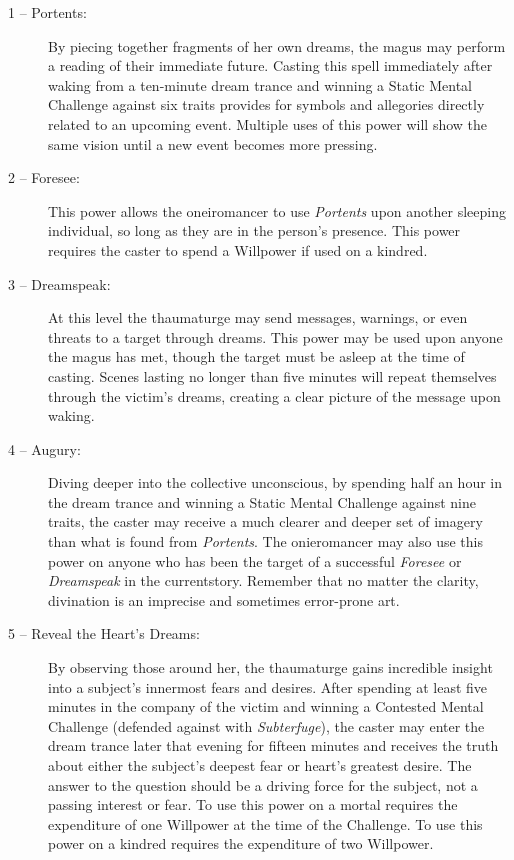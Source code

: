 \begin{description}
	\item[1 -- Portents:]  By piecing together fragments of her own dreams, the magus may perform a reading of their 
	immediate future.  Casting this spell immediately after waking from a ten-minute dream trance and winning a 
	Static Mental Challenge against six traits provides for symbols and allegories directly related to an upcoming 
	event.  Multiple uses of this power will show the same vision until a new event becomes more pressing.
	\item[2 -- Foresee:]  This power allows the oneiromancer to use \emph{Portents} upon another sleeping individual, 
	so long as they are in the person's presence.  This power requires the caster to spend a Willpower if used on 
	a kindred.
	\item[3 -- Dreamspeak:]  At this level the thaumaturge may send messages, warnings, or even threats to a target 
	through dreams.  This power may be used upon anyone the magus has met, though the target must be asleep at the time 
	of casting.  Scenes lasting no longer than five minutes will repeat themselves through the victim's dreams, creating 
	a clear picture of the message upon waking.
	\item[4 -- Augury:]  Diving deeper into the collective unconscious, by spending half an hour in the dream trance and 
	winning a Static Mental Challenge against nine traits, the caster may receive a much clearer and deeper set of imagery 
	than what is found from \emph{Portents}.  The onieromancer may also use this power on anyone who has been the target 
	of a successful \emph{Foresee} or \emph{Dreamspeak} in the currentstory.  Remember that no matter the clarity, divination 
	is an imprecise and sometimes error-prone art.
	\item[5 -- Reveal the Heart's Dreams:]  By observing those around her, the thaumaturge gains incredible insight into 
	a subject's innermost fears and desires.  After spending at least five minutes in the company of the victim and winning 
	a Contested Mental Challenge (defended against with \emph{Subterfuge}), the caster may enter the dream trance later that 
	evening for fifteen minutes and receives the truth about either the subject's deepest fear or heart's greatest desire.  
	The answer to the question should be a driving force for the subject, not a passing interest or fear.  To use this power 
	on a mortal requires the expenditure of one Willpower at the time of the Challenge.  To use this power on a kindred 
	requires the expenditure of two Willpower.
\end{description}

